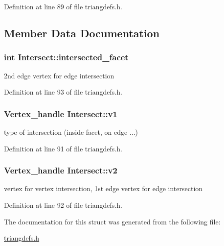 Definition at line 89 of file triangdefs.h.



\subsection{Member Data Documentation}
\hypertarget{structIntersect_ae7d78402b79c68e9110144201a7403a6}{
\subsubsection[{intersected\_\-facet}]{\setlength{\rightskip}{0pt plus 5cm}int {\bf Intersect::intersected\_\-facet}}}
\label{structIntersect_ae7d78402b79c68e9110144201a7403a6}


2nd edge vertex for edge intersection 



Definition at line 93 of file triangdefs.h.

\hypertarget{structIntersect_ac475cd53466b32a3b4a96611bb6be216}{
\subsubsection[{v1}]{\setlength{\rightskip}{0pt plus 5cm}Vertex\_\-handle {\bf Intersect::v1}}}
\label{structIntersect_ac475cd53466b32a3b4a96611bb6be216}


type of intersection (inside facet, on edge ...) 



Definition at line 91 of file triangdefs.h.

\hypertarget{structIntersect_ae44020d73365a60da831bfa222703e4e}{
\subsubsection[{v2}]{\setlength{\rightskip}{0pt plus 5cm}Vertex\_\-handle {\bf Intersect::v2}}}
\label{structIntersect_ae44020d73365a60da831bfa222703e4e}


vertex for vertex intersection, 1st edge vertex for edge intersection 



Definition at line 92 of file triangdefs.h.



The documentation for this struct was generated from the following file:\begin{DoxyCompactItemize}
\item 
\hyperlink{triangdefs_8h}{triangdefs.h}\end{DoxyCompactItemize}
